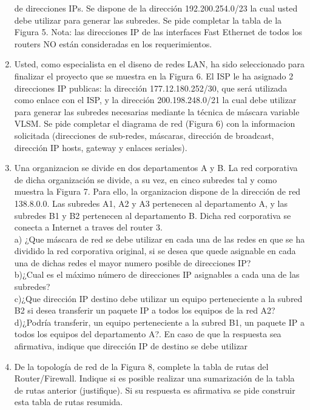 \documentclass{udparticle}
\begin{document}
\begin{enumerate}
de direcciones IPs. Se dispone de la dirección 192.200.254.0/23 la cual 
usted debe utilizar para generar las subredes. Se pide completar la 
tabla de la Figura 5. Nota: las direcciones IP de las interfaces Fast 
Ethernet de todos los routers NO están consideradas en los requerimientos.
\item Usted, como especialista en el diseno de redes LAN, ha sido seleccionado para
finalizar el proyecto que se muestra en la Figura 6. El ISP le ha asignado 2 
direcciones IP publicas: la dirección 177.12.180.252/30, que será utilizada como 
enlace con el ISP, y la dirección 200.198.248.0/21 la cual debe utilizar para 
generar las subredes necesarias mediante la técnica de máscara variable VLSM.
Se pide completar el diagrama de red (Figura 6) con la informacion solicitada
(direcciones de sub-redes, máscaras, dirección de broadcast, dirección IP 
hosts, gateway y enlaces seriales).
\clearpage
\item Una organizacion se divide en dos departamentos A y B. La red corporativa de 
dicha organización se divide, a su vez, en cinco subredes tal y como muestra la 
Figura 7. Para ello, la organizacion dispone de la dirección de red 138.8.0.0. 
Las subredes A1, A2 y A3 pertenecen al departamento A, y las subredes B1 y B2 
pertenecen al departamento B. Dicha red corporativa se conecta a Internet    a traves 
del router 3.\\
a) ¿Que máscara de red se debe utilizar en cada una de las redes en que se ha   
dividido la red corporativa original, si se desea que quede asignable en cada una 
de dichas redes el mayor numero posible de direcciones IP?\\

b)¿Cual es el máximo número de direcciones IP asignables a cada una de las subredes?\\

c)¿Que dirección IP destino debe utilizar un equipo perteneciente a la subred B2 si
desea transferir un paquete IP a todos los equipos de la red A2?\\

d)¿Podría transferir, un equipo perteneciente a la subred B1, un paquete IP a todos
los equipos del departamento A?. En caso de que la respuesta sea afirmativa,
indique que dirección IP de destino se debe utilizar\\


\item De la topología de red de la Figura 8, complete la tabla de rutas del 
Router/Firewall. Indique si es posible realizar una sumarización de la tabla de 
rutas anterior (justifique). Si su respuesta es afirmativa se pide construir esta tabla de rutas resumida.


\end{enumerate}
\end{document}

